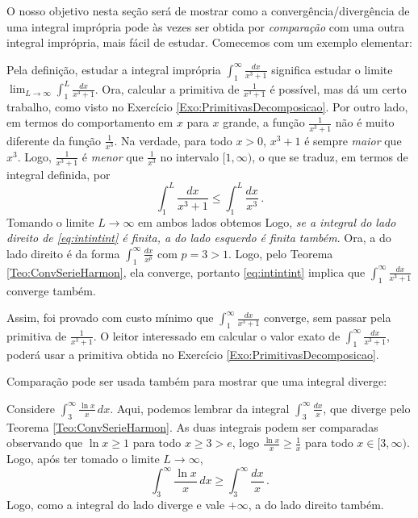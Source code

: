 O nosso objetivo nesta seção será de mostrar como a convergência/divergência de
uma integral imprópria pode às vezes ser obtida por \emph{comparação} com uma
outra integral imprópria, mais fácil de estudar. Comecemos com um exemplo
elementar:

\begin{ex}
Pela definição, estudar a 
integral imprópria $\int_1^\infty\frac{dx}{x^3+1}$ significa estudar o limite 
$\lim_{L\to \infty}\int_1^L\frac{dx}{x^3+1}$. Ora, calcular a
primitiva de $\frac{1}{x^3+1}$ é possível, mas dá um certo trabalho, como
visto no Exercício \ref{Exo:PrimitivasDecomposicao}. Por outro lado, 
em termos do comportamento em $x$ para $x$ grande, a função $\frac{1}{x^3+1}$
não é muito diferente da função $\frac{1}{x^3}$. Na verdade, para
todo $x>0$, $x^3+1$ é sempre
\emph{maior} que $x^3$. Logo, $\frac{1}{x^3+1}$ é \emph{menor} que
$\frac{1}{x^3}$ no intervalo $[1,\infty)$, o que se traduz, em termos de
integral definida, por
$$\int_1^L\frac{dx}{x^3+1}\leq \int_1^L\frac{dx}{x^3}\,.$$
Tomando o limite $L\to \infty$ em ambos lados obtemos
Logo, \emph{se a integral do lado direito de \eqref{eq:intintint} é finita, a do
lado esquerdo é finita também}. Ora, a do lado direito é da forma
$\int_1^\infty\frac{dx}{x^p}$ com $p=3>1$. Logo, pelo Teorema
\ref{Teo:ConvSerieHarmon}, ela converge, portanto \eqref{eq:intintint} implica
que $\int_1^\infty\frac{dx}{x^3+1}$ converge também. 

Assim, foi provado com custo
mínimo que  $\int_1^\infty\frac{dx}{x^3+1}$ converge, sem passar pela primitiva
de $\frac{1}{x^3+1}$.
O leitor interessado em calcular o valor exato de
$\int_1^\infty\frac{dx}{x^3+1}$, poderá usar a primitiva obtida no Exercício
\ref{Exo:PrimitivasDecomposicao}.
\end{ex}

Comparação pode ser usada também para mostrar que uma integral diverge:

\begin{ex}
Considere $\int_3^\infty\frac{\ln x}{x}\,dx$. Aqui, podemos lembrar da integral
$\int_3^\infty\frac{dx}{x}$, que diverge pelo Teorema \ref{Teo:ConvSerieHarmon}.
As duas integrais podem ser comparadas observando que $\ln x\geq 1$ para todo
$x\geq 3>e$, logo $\frac{\ln x}{x}\geq \frac{1}{x}$ para todo $x\in
[3,\infty)$. Logo, após ter tomado o limite $L\to \infty$,
$$
\int_3^\infty\frac{\ln x}{x}\,dx\geq \int_3^\infty\frac{dx}{x}\,.
$$
Logo, como a integral do lado diverge e vale $+\infty$, a do lado direito
também.  
\end{ex}

